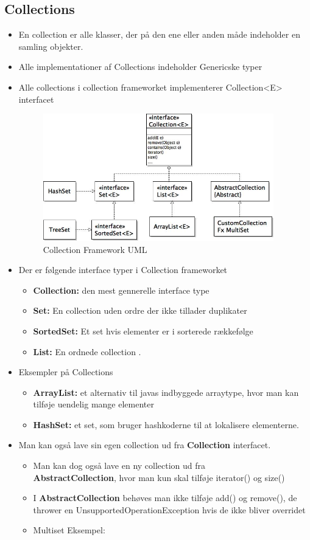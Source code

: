 \documentclass{article}
\begin{document}
\subsection{Collections}
\begin{itemize}
	\item En collection er alle klasser, der på den ene eller anden måde indeholder en samling objekter. 
	\item Alle implementationer af Collections indeholder Genericske typer
	\item Alle collections i collection frameworket implementerer Collection<E> interfacet
	\begin{figure}[ht!]
		\centering
		\includegraphics[width=100mm]{img/collectionsUML.jpeg}
		\caption{Collection Framework UML 	\label{UMLCollections}}
	\end{figure}
	\item Der er følgende interface typer i Collection frameworket
	\begin{itemize}
		\item \textbf{Collection:} den mest gennerelle interface type
		\item \textbf{Set:} En collection uden ordre der ikke tillader duplikater
		\item \textbf{SortedSet:} Et set hvis elementer er i sorterede rækkefølge 
		\item \textbf{List:} En ordnede collection .
	\end{itemize}
	\item Eksempler på Collections 
	\begin{itemize}
		\item \textbf{ArrayList:} et alternativ til javas indbyggede arraytype, hvor man kan tilføje uendelig mange elementer
		\item \textbf{HashSet:} et set, som bruger hashkoderne til at lokalisere elementerne. 
	\end{itemize}
	\item Man kan også lave sin egen collection ud fra \textbf{Collection} interfacet.
	\begin{itemize}
		\item Man kan dog også lave en ny collection ud fra \\ \textbf{AbstractCollection}, hvor man kun skal tilføje iterator() og size()
		\item I \textbf{AbstractCollection} behøves man ikke tilføje add() og remove(), de thrower en UnsupportedOperationException hvis de ikke bliver overridet
		\item Multiset Eksempel:


\end{itemize}
\end{itemize}
\end{document}
